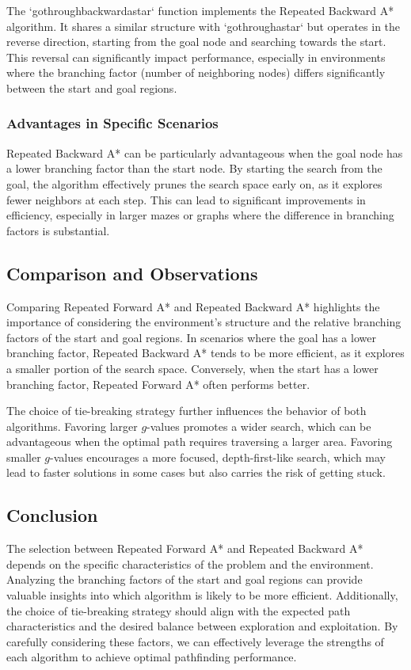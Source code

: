 \documentclass[12pt]{article}
\begin{document}
The `gothroughbackwardastar` function implements the Repeated Backward A* algorithm.
It shares a similar structure with `gothroughastar` but operates in the reverse direction,
starting from the goal node and searching towards the start.
This reversal can significantly impact performance,
especially in environments where the branching factor 
(number of neighboring nodes)
differs significantly between the start and goal regions.

\subsubsection{Advantages in Specific Scenarios}

Repeated Backward A* can be particularly advantageous when the goal node has a lower branching factor than the start node. 
By starting the search from the goal, the algorithm effectively prunes the search space early on, 
as it explores fewer neighbors at each step. 
This can lead to significant improvements in efficiency, 
especially in larger mazes or graphs where the difference in branching factors is substantial.

\subsection{Comparison and Observations}

Comparing Repeated Forward A* and Repeated Backward A* highlights the importance of considering the environment's structure and the relative branching factors of the start and goal regions. 
In scenarios where the goal has a lower branching factor, 
Repeated Backward A* tends to be more efficient, 
as it explores a smaller portion of the search space. 
Conversely, 
when the start has a lower branching factor, 
Repeated Forward A* often performs better.

The choice of tie-breaking strategy further influences the behavior of both algorithms. 
Favoring larger $g$-values promotes a wider search, 
which can be advantageous when the optimal path requires traversing a larger area. 
Favoring smaller $g$-values encourages a more focused, 
depth-first-like search, 
which may lead to faster solutions in some cases but also carries the risk of getting stuck.

\subsection{Conclusion}

The selection between Repeated Forward A* and Repeated Backward A* depends on the specific characteristics of the problem and the environment. 
Analyzing the branching factors of the start and goal regions can provide valuable insights into which algorithm is likely to be more efficient. 
Additionally, 
the choice of tie-breaking strategy should align with the expected path characteristics and the desired balance between exploration and exploitation. 
By carefully considering these factors, 
we can effectively leverage the strengths of each algorithm to achieve optimal pathfinding performance. 
\end{document}
